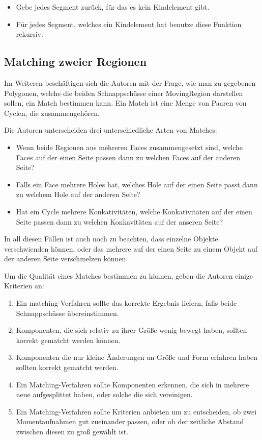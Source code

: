 \begin{itemize}
\item Gebe jedes Segment zurück, für das es kein Kindelement gibt.
\item Für jedes Segment, welches ein Kindelement hat benutze diese Funktion rekursiv.
\end{itemize}

\subsection{Matching zweier Regionen}

Im Weiteren beschäftigen sich die Autoren mit der Frage, wie man zu gegebenen Polygonen, welche die beiden Schnappschüsse einer MovingRegion darstellen sollen, ein Match bestimmen kann. Ein Match ist eine Menge von Paaren von Cyclen, die zusammengehören.

Die Autoren unterscheiden drei unterschiedliche Arten von Matches:

\begin{itemize}
\item Wenn beide Regionen aus mehreren Faces zusammengesetzt sind, welche Faces auf der einen Seite passen dann zu welchen Faces auf der anderen Seite?
\item Falls ein Face mehrere Holes hat, welches Hole auf der einen Seite passt dann zu welchem Hole auf der anderen Seite?
\item Hat ein Cycle mehrere Konkativitäten, welche Konkativitäten auf der einen Seite passen dann zu welchen Konkavitäten auf der anseren Seite?
\end{itemize}

In all diesen Fällen ist auch noch zu beachten, dass einzelne Objekte verschwienden können, oder das mehrere auf der einen Seite zu einem Objekt auf der anderen Seite verschmelzen können.

Um die Qualität eines Matches bestimmen zu können, geben die Autoren einige Kriterien an:

\begin{enumerate}
\item Ein matching-Verfahren sollte das korrekte Ergebnis liefern, falls beide Schnappschüsse übereinstimmen.
\item Komponenten, die sich relativ zu ihrer Größe wenig bewegt haben, sollten korrekt gematcht werden können.
\item Komponenten die nur kleine Änderungen an Größe und Form erfahren haben sollten korrekt gematcht werden.
\item Ein Matching-Verfahren sollte Komponenten erkennen, die sich in mehrere neue aufgesplittet haben, oder solche die sich vereinigen.
\item Ein Matching-Verfahren sollte Kriterien anbieten um zu entscheiden, ob zwei Momentaufnahmen gut zueinander passen, oder ob der zeitliche Abstand zwischen diesen zu groß gewählt ist.
\end{enumerate}

